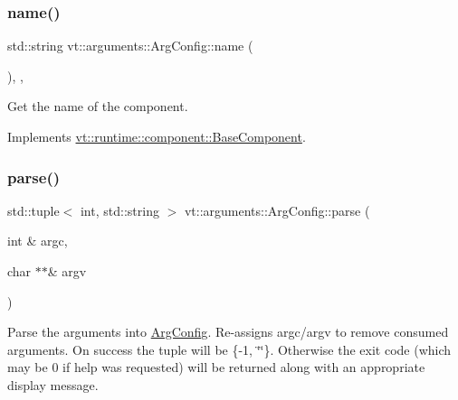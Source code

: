 \mbox{\label{structvt_1_1arguments_1_1_arg_config_ade5e5994235f0953970fc3f460f9167a}} 
\subsubsection{\texorpdfstring{name()}{name()}}
{\footnotesize\ttfamily std\+::string vt\+::arguments\+::\+Arg\+Config\+::name (\begin{DoxyParamCaption}{ }\end{DoxyParamCaption})\hspace{0.3cm}{\ttfamily [inline]}, {\ttfamily [override]}, {\ttfamily [virtual]}}



Get the name of the component. 



Implements \hyperlink{structvt_1_1runtime_1_1component_1_1_base_component_a7701485f3539f78d42e6bad47fc7eb78}{vt\+::runtime\+::component\+::\+Base\+Component}.

\mbox{\label{structvt_1_1arguments_1_1_arg_config_a124125d908a910cf52c6c59a3f0f2713}} 
\subsubsection{\texorpdfstring{parse()}{parse()}}
{\footnotesize\ttfamily std\+::tuple$<$ int, std\+::string $>$ vt\+::arguments\+::\+Arg\+Config\+::parse (\begin{DoxyParamCaption}\item[{int \&}]{argc,  }\item[{char $\ast$$\ast$\&}]{argv }\end{DoxyParamCaption})}

Parse the arguments into \hyperlink{structvt_1_1arguments_1_1_arg_config}{Arg\+Config}. Re-\/assigns argc/argv to remove consumed arguments. On success the tuple will be \{-\/1, \char`\"{}\char`\"{}\}. Otherwise the exit code (which may be 0 if help was requested) will be returned along with an appropriate display message. \mbox{\label{structvt_1_1arguments_1_1_arg_config_ac6711ab96113f032b9e0a0b12d24eda3}} 
